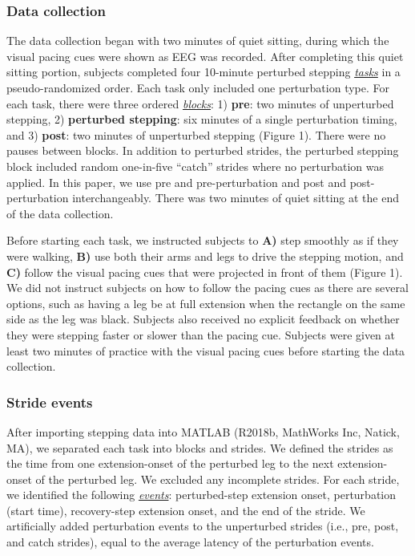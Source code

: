 \documentclass[shortpaper,twoside,web]{ieeecolor}
\begin{document}
\subsubsection{Data collection}
The data collection began with two minutes of quiet sitting, during which the visual pacing cues were shown as EEG was recorded. After completing this quiet sitting portion, subjects completed four 10-minute perturbed stepping \textit{\underline{tasks}} in a pseudo-randomized order. Each task only included one perturbation type. For each task, there were three ordered \textit{\underline{blocks}}: 1) \textbf{pre}: two minutes of unperturbed stepping, 2)  \textbf{perturbed stepping}: six minutes of a single perturbation timing, and 3)  \textbf{post}: two minutes of unperturbed stepping (Figure 1). There were no pauses between blocks. In addition to perturbed strides, the perturbed stepping block included random one-in-five “catch” strides where no perturbation was applied. In this paper, we use pre and pre-perturbation and post and post-perturbation interchangeably. There was two minutes of quiet sitting at the end of the data collection.

Before starting each task, we instructed subjects to \textbf{A)} step smoothly as if they were walking, \textbf{B)} use both their arms and legs to drive the stepping motion, and \textbf{C)} follow the visual pacing cues that were projected in front of them (Figure 1). We did not instruct subjects on how to follow the pacing cues as there are several options, such as having a leg be at full extension when the rectangle on the same side as the leg was black. Subjects also received no explicit feedback on whether they were stepping faster or slower than the pacing cue. Subjects were given at least two minutes of practice with the visual pacing cues before starting the data collection.

\subsubsection{Stride events}
After importing stepping data into MATLAB (R2018b, MathWorks Inc, Natick, MA), we separated each task into blocks and strides. We defined the strides as the time from one extension-onset of the perturbed leg to the next extension-onset of the perturbed leg. We excluded any incomplete strides. For each stride, we identified the following \textit{\underline{events}}: perturbed-step extension onset, perturbation (start time), recovery-step extension onset, and the end of the stride. We artificially added perturbation events to the unperturbed strides (i.e., pre, post, and catch strides), equal to the average latency of the perturbation events.
\end{document}
